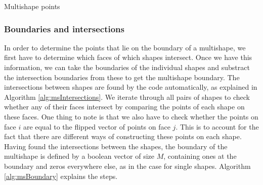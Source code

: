 \begin{algorithm}[H]	\label{alg:msPts}
	\SetAlgoLined
	\caption{Multishape points}
\end{algorithm}

\subsubsection{Boundaries and intersections}
In order to  determine the points that lie on the boundary of a multishape, we first have to determine which faces of which shapes intersect. Once we have this information, we can take the boundaries of the individual shapes and substract the intersection boundaries from these to get the multishape boundary.
The intersections between shapes are found by the code automatically, as explained in Algorithm \ref{alg:msIntersections}. We iterate through all pairs of shapes to check whether any of their faces intersect by comparing the points of each shape on these faces. One thing to note is that we also have to check whether the points on face $i$ are equal to the flipped vector of points on face $j$. This is to account for the fact that there are different ways of constructing these points on each shape.
Having found the intersections between the shapes, the boundary of the multishape is defined by a boolean vector of size $M$, containing ones at the boundary and zeros everywhere else, as in the case for single shapes. Algorithm \ref{alg:msBoundary} explains the steps.

